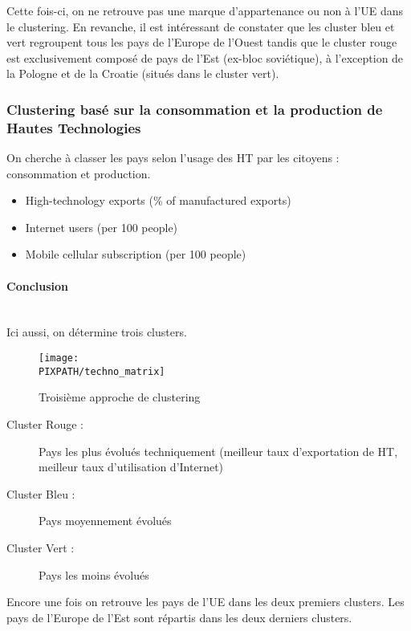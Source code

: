 \vskip 6pt

Cette fois-ci, on ne retrouve pas une marque d'appartenance ou non à l'UE dans
le clustering. En revanche, il est intéressant de constater que les cluster bleu
et vert regroupent tous les pays de l'Europe de l'Ouest tandis que le cluster rouge
est exclusivement composé de pays de l'Est (ex-bloc soviétique), à l'exception de
la Pologne et de la Croatie (situés dans le cluster vert).


\subsubsection{Clustering basé sur la consommation et la production de
Hautes Technologies}

On cherche à classer les pays selon l'usage des HT par les citoyens :
consommation et production.

\begin{itemize}
\item High-technology exports (\% of manufactured exports)
\item Internet users (per 100 people)
\item Mobile cellular subscription (per 100 people)
\end{itemize}

\paragraph{Conclusion}\hfill\\

Ici aussi, on détermine trois clusters.

\begin{sidewaysfigure}[h]
\centering
\caption{Troisième approche de clustering}
\texttt{[image: \\PIXPATH/techno\_matrix]}
\end{sidewaysfigure}

\begin{description}
\item[Cluster Rouge : ] Pays les plus évolués techniquement (meilleur taux d'exportation de HT, meilleur taux d'utilisation d'Internet)
\item[Cluster Bleu : ] Pays moyennement évolués
\item[Cluster Vert : ] Pays les moins évolués
\end{description}

Encore une fois on retrouve les pays de l'UE dans les deux premiers clusters. Les
pays de l'Europe de l'Est sont répartis dans les deux derniers clusters.
